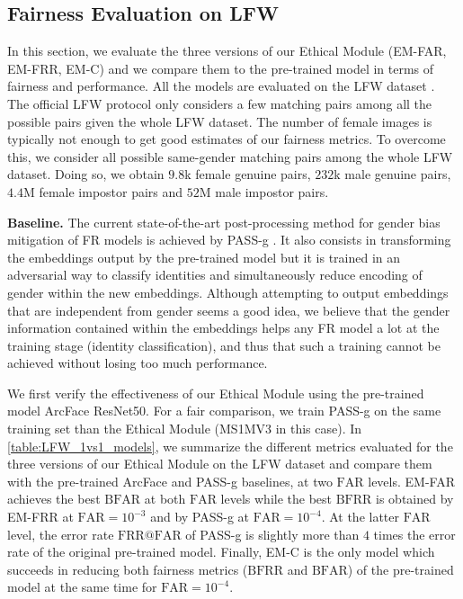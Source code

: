 \documentclass[nohyperref]{article}
\theoremstyle{plain}
\theoremstyle{definition}
\theoremstyle{remark}
\begin{document}
\subsection{Fairness Evaluation on LFW}

In this section, we evaluate the three versions of our Ethical Module (EM-FAR, EM-FRR, EM-C) and we compare them to the pre-trained model in terms of fairness and performance. All the models are evaluated on the LFW dataset \cite{LFW_dataset}. The official LFW protocol only considers a few matching pairs among all the possible pairs given the whole LFW dataset. The number of female images is typically not enough to get good estimates of our fairness metrics. To overcome this, we consider all possible same-gender matching pairs among the whole LFW dataset. Doing so, we obtain $9.8$k female genuine pairs, $232$k male genuine pairs, $4.4$M female impostor pairs and $52$M male impostor pairs.





{\bf Baseline.} The current state-of-the-art post-processing method for gender bias mitigation of FR models is achieved by PASS-g \cite{dhar2021pass}. It also consists in transforming the embeddings output by the pre-trained model but it is trained in an adversarial way to classify identities and simultaneously reduce encoding of gender within the new embeddings. Although attempting to output embeddings that are independent from gender seems a good idea, we believe that the gender information contained within the embeddings helps any FR model a lot at the training stage (identity classification), and thus that such a training cannot be achieved without losing too much performance.

We first verify the effectiveness of our Ethical Module using the pre-trained model ArcFace ResNet50. For a fair comparison, we train PASS-g on the same training set than the Ethical Module (MS1MV3 in this case). In \autoref{table:LFW_1vs1_models}, we summarize the different metrics evaluated for the three versions of our Ethical Module on the LFW dataset and compare them with the pre-trained ArcFace and PASS-g baselines, at two $\mathrm{FAR}$ levels. EM-FAR achieves the best $\mathrm{BFAR}$ at both $\mathrm{FAR}$ levels while the best $\mathrm{BFRR}$ is obtained by EM-FRR at $\mathrm{FAR}=10^{-3}$ and by PASS-g at $\mathrm{FAR}=10^{-4}$. At the latter $\mathrm{FAR}$ level, the error rate $\mathrm{FRR}@\mathrm{FAR}$ of PASS-g is slightly more than $4$ times the error rate of the original pre-trained model. Finally, EM-C is the only model which succeeds in reducing both fairness metrics ($\mathrm{BFRR}$ and $\mathrm{BFAR}$) of the pre-trained model at the same time for  $\mathrm{FAR}=10^{-4}$.
\end{document}
